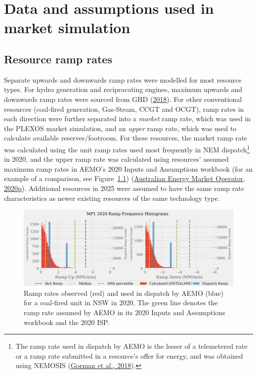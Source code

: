 \documentclass[12pt,a4paper,]{report}
\begin{document}
\appendix
\renewcommand\thefigure{\thechapter.\arabic{figure}}
\renewcommand\thetable{\thechapter.\arabic{table}}

\hypertarget{sec:appendix-reserves_assumptions}{%
\chapter{Data and assumptions used in market
simulation}\label{sec:appendix-reserves_assumptions}}

\hypertarget{resource-ramp-rates}{%
\section{Resource ramp rates}\label{resource-ramp-rates}}

Separate upwards and downwards ramp rates were modelled for most
resource types. For hydro generation and reciprocating engines, maximum
upwards and downwards ramp rates were sourced from GHD
(\protect\hyperlink{ref-ghd2018AEMOCost2018}{2018}). For other
conventional resources (coal-fired generation, Gas-Steam, CCGT and
OCGT), ramp rates in each direction were further separated into a
\emph{market} ramp rate, which was used in the PLEXOS market simulation,
and an \emph{upper} ramp rate, which was used to calculate available
reserves/footroom. For these resources, the market ramp rate was
calculated using the unit ramp rates used most frequently in NEM
dispatch\footnote{The ramp rate used in dispatch by AEMO is the lesser
  of a telemetered rate or a ramp rate submitted in a resource's offer
  for energy, and was obtained using NEMOSIS
  (\protect\hyperlink{ref-gormanNEMOSISNEMOpen2018}{Gorman et al.,
  2018}).} in 2020, and the upper ramp rate was calculated using
resources' assumed maximum ramp rates in AEMO's 2020 Inputs and
Assumptions workbook (for an example of a comparison, see
Figure~\ref{fig:ramp_rate_comparison})
(\protect\hyperlink{ref-australianenergymarketoperator2020InputsAssumptions2020}{Australian
Energy Market Operator, 2020p}). Additional resources in 2025 were
assumed to have the same ramp rate characteristics as newer existing
resources of the same technology type.

\begin{figure}
\hypertarget{fig:ramp_rate_comparison}{%
\centering
\includegraphics{source/figures/coal_market_upper_ramps.png}
\caption[Observed, submitted and ISP ramp rates for a NSW coal-fired
unit]{Ramp rates observed (red) and used in dispatch by AEMO (blue) for
a coal-fired unit in NSW in 2020. The green line denotes the ramp rate
assumed by AEMO in its 2020 Inputs and Assumptions workbook and the 2020
ISP.}\label{fig:ramp_rate_comparison}
}
\end{figure}
\end{document}

